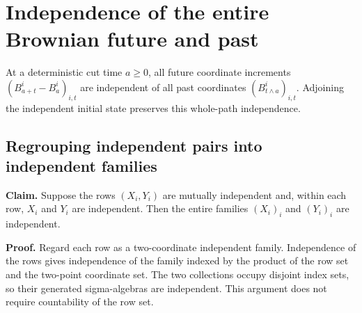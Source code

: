 \documentclass[11pt,a4paper]{report}
\begin{document}
\section{\texorpdfstring{Independence of the entire Brownian future and past}{Independence of the entire Brownian future and past}}
\label{proof-module-WassersteinMixing-ActualMarkovNoise-lean}


At a deterministic cut time \(a\ge0\), all future coordinate increments \((B^i_{a+t}-B^i_a)_{i,t}\) are independent of all past coordinates \((B^i_{t\wedge a})_{i,t}\). Adjoining the independent initial state preserves this whole-path independence.

\subsection{\texorpdfstring{Regrouping independent pairs into independent families}{Regrouping independent pairs into independent families}}
\label{report-step-WassersteinMixing-ActualMarkovNoise-lean-1}


\textbf{Claim.} Suppose the rows \((X_i,Y_i)\) are mutually independent and, within each row, \(X_i\) and \(Y_i\) are independent. Then the entire families \((X_i)_i\) and \((Y_i)_i\) are independent.



\textbf{Proof.} Regard each row as a two-coordinate independent family. Independence of the rows gives independence of the family indexed by the product of the row set and the two-point coordinate set. The two collections occupy disjoint index sets, so their generated sigma-algebras are independent. This argument does not require countability of the row set.
\end{document}
